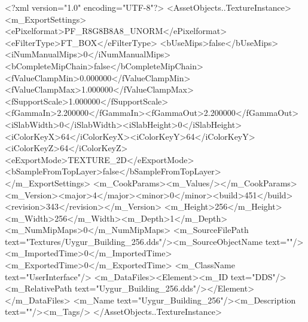<?xml version="1.0" encoding="UTF-8"?>
<AssetObjects..TextureInstance>
  <m_ExportSettings>
    <ePixelformat>PF_R8G8B8A8_UNORM</ePixelformat><eFilterType>FT_BOX</eFilterType>
    <bUseMips>false</bUseMips><iNumManualMips>0</iNumManualMips><bCompleteMipChain>false</bCompleteMipChain>
    <fValueClampMin>0.000000</fValueClampMin><fValueClampMax>1.000000</fValueClampMax><fSupportScale>1.000000</fSupportScale>
    <fGammaIn>2.200000</fGammaIn><fGammaOut>2.200000</fGammaOut><iSlabWidth>0</iSlabWidth><iSlabHeight>0</iSlabHeight>
    <iColorKeyX>64</iColorKeyX><iColorKeyY>64</iColorKeyY><iColorKeyZ>64</iColorKeyZ>
    <eExportMode>TEXTURE_2D</eExportMode><bSampleFromTopLayer>false</bSampleFromTopLayer>
  </m_ExportSettings>
  <m_CookParams><m_Values/></m_CookParams>
  <m_Version><major>4</major><minor>0</minor><build>451</build><revision>343</revision></m_Version>
  <m_Height>256</m_Height><m_Width>256</m_Width><m_Depth>1</m_Depth><m_NumMipMaps>0</m_NumMipMaps>
  <m_SourceFilePath text="Textures/Uygur_Building_256.dds"/><m_SourceObjectName text=""/>
  <m_ImportedTime>0</m_ImportedTime><m_ExportedTime>0</m_ExportedTime>
  <m_ClassName text="UserInterface"/>
  <m_DataFiles><Element><m_ID text="DDS"/><m_RelativePath text="Uygur_Building_256.dds"/></Element></m_DataFiles>
  <m_Name text="Uygur_Building_256"/><m_Description text=""/><m_Tags/>
</AssetObjects..TextureInstance>
